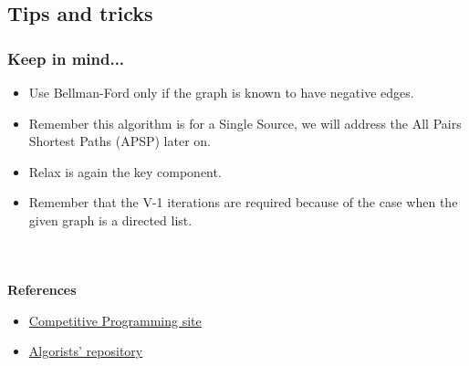 \documentclass[article]{beamer}
\begin{document}
\subsection{Tips and tricks}
\begin{frame}
	\frametitle{Keep in mind...}
	\begin{itemize}
		\item Use Bellman-Ford only if the graph is known to have negative edges.
		\item Remember this algorithm is for a Single Source, we will address the All Pairs Shortest Paths (APSP) later on.
		\item Relax is again the key component.
		\item Remember that the V-1 iterations are required because of the case when the given graph is a directed list.
	\end{itemize}
\end{frame}

\begin{frame}[plain]
\frametitle{}
\begin{center}
\Huge{\color{blue}{Q \& A}} \\
\vspace{5mm}
\end{center}
\end{frame}

\begin{frame}[plain]
	\textbf{References}
	\begin{itemize}
		\item \href{https://sites.google.com/site/stevenhalim/}{Competitive Programming site}
		\item \href{https://github.com/davidjacobo/algorists/}{Algorists' repository}
	\end{itemize}
\end{frame}
\end{document}
